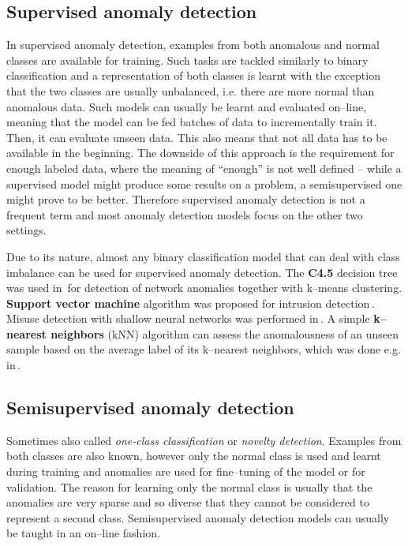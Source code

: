\subsection{Supervised anomaly detection}

In supervised anomaly detection, examples from both anomalous and
normal classes are available for training. Such tasks are tackled
similarly to binary classification and a representation of both classes
is learnt with the exception that the two classes are usually unbalanced,
i.e. there are more normal than anomalous data. Such models can usually
be learnt and evaluated on--line, meaning that the model can be fed
batches of data to incrementally train it. Then, it can evaluate unseen
data. This also means that not all data has to be available in the
beginning. The downside of this approach is the requirement for enough
labeled data, where the meaning of ``enough'' is not well defined
-- while a supervised model might produce some results on a problem,
a semisupervised one might prove to be better. Therefore supervised
anomaly detection is not a frequent term and most anomaly detection
models focus on the other two settings.

Due to its nature, almost any binary classification model that can
deal with class imbalance can be used for supervised anomaly detection.
The \textbf{C4.5} decision tree was used in\,\cite{muniyandi2012network}
for detection of network anomalies together with k--means clustering.
\textbf{Support vector machine} algorithm was proposed for intrusion
detection\,\cite{mukkamala2002intrusion}. Misuse detection with
shallow neural networks was performed in\,\cite{ghosh1999study}.
A simple \textbf{k--nearest neighbors} (kNN) algorithm can assess
the anomalousness of an unseen sample based on the average label of
its k--nearest neighbors, which was done e.g. in\,\cite{su2011using}.

\subsection{Semisupervised anomaly detection}

Sometimes also called \textit{one-class classification} or \textit{novelty
detection}. Examples from both classes are also known, however only
the normal class is used and learnt during training and anomalies
are used for fine--tuning of the model or for validation. The reason
for learning only the normal class is usually that the anomalies are
very sparse and so diverse that they cannot be considered to represent
a second class. Semisupervised anomaly detection models can usually
be taught in an on--line fashion.

